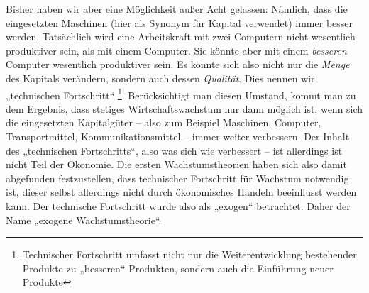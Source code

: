 Bisher haben wir aber eine Möglichkeit außer Acht gelassen: Nämlich, dass die eingesetzten Maschinen (hier als Synonym für Kapital verwendet) immer besser werden. Tatsächlich wird eine Arbeitskraft mit zwei Computern nicht wesentlich produktiver sein, als mit einem Computer. Sie könnte aber mit einem \textit{besseren} Computer wesentlich produktiver sein. Es könnte sich also nicht nur die \textit{Menge} des Kapitals verändern, sondern auch dessen \textit{Qualität}. Dies nennen wir „technischen Fortschritt“ \footnote{Technischer Fortschritt umfasst nicht nur die Weiterentwicklung bestehender Produkte zu „besseren“ Produkten, sondern auch die Einführung neuer Produkte}.
Berücksichtigt man diesen Umstand, kommt man zu dem Ergebnis, dass stetiges Wirtschaftswachstum nur dann möglich ist, wenn sich die eingesetzten Kapitalgüter – also zum Beispiel Maschinen, Computer, Transportmittel, Kommunikationsmittel – immer weiter verbessern.
Der Inhalt des „technischen Fortschritts“, also was sich wie verbessert – ist allerdings ist nicht Teil der Ökonomie. Die ersten Wachstumstheorien haben sich also damit abgefunden festzustellen, dass technischer Fortschritt für Wachstum notwendig ist, dieser selbst allerdings nicht durch ökonomisches Handeln beeinflusst werden kann. Der technische Fortschritt wurde also als „exogen“ betrachtet. Daher der Name „exogene Wachstumstheorie“.
















